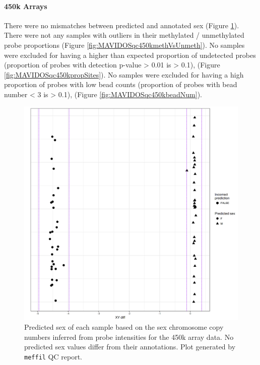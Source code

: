 \documentclass[
]{book}
\begin{document}
\hypertarget{k-arrays}{%
\paragraph{450k Arrays}\label{k-arrays}}

There were no mismatches between predicted and annotated sex (Figure \ref{fig:MAVIDOSqc450ksexMismatch}).
There were not any samples with outliers in their methylated / unmethylated probe proportions (Figure \ref{fig:MAVIDOSqc450kmethVsUnmeth}).
No samples were excluded for having a higher than expected proportion of undetected probes (proportion of probes with detection p-value \textgreater{} 0.01 is \textgreater{} 0.1), (Figure \ref{fig:MAVIDOSqc450kpropSites}).
No samples were excluded for having a high proportion of probes with low bead counts (proportion of probes with bead number \textless{} 3 is \textgreater{} 0.1), (Figure \ref{fig:MAVIDOSqc450kbeadNum}).

\begin{figure}

{\centering \includegraphics[width=0.8\linewidth]{figs/MAVIDOSqc450ksexMismatch} 

}

\caption{Predicted sex of each sample based on the sex chromosome copy numbers inferred from probe intensities for the 450k array data. No predicted sex values differ from their annotations. Plot generated by \texttt{meffil} QC report.}\label{fig:MAVIDOSqc450ksexMismatch}
\end{figure}
\end{document}
